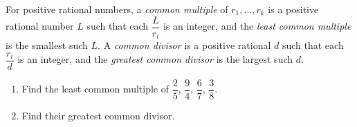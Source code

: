 For positive rational numbers, a \emph{common multiple} of $r_1,\ldots,r_k$ is a positive rational number $L$ such that each $\dfrac{L}{r_i}$ is an integer, and the \emph{least common multiple} is the smallest such $L$. A \emph{common divisor} is a positive rational $d$ such that each $\dfrac{r_i}{d}$ is an integer, and the \emph{greatest common divisor} is the largest such $d$.
\begin{enumerate}
\item[(a)] Find the least common multiple of $\dfrac{2}{5}$, $\dfrac{9}{4}$, $\dfrac{6}{7}$, $\dfrac{3}{8}$.
\item[(b)] Find their greatest common divisor.
\end{enumerate}
